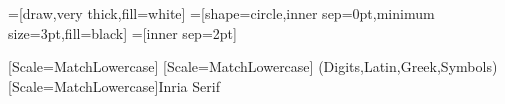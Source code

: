 


\usepackage{etex} %



\usepackage[english]{babel}

\usepackage{cmap}
\usepackage{graphicx}
\usepackage{color,colortbl,spot}
\usepackage{pgfplots}




\usepackage{hyperref}
\usepackage{appendixnumberbeamer}

\usepackage{booktabs} %
\usepackage{subcaption}
\usepackage{comment}


\usepackage{amsmath}
\usepackage{amssymb}


\usepackage{multicol}
\usepackage{multirow}
\usepackage{array} %



\usepackage[absolute,overlay]{textpos}
\usepackage{overpic}
\usepackage{tikz}
\usetikzlibrary{decorations.pathreplacing}
\usetikzlibrary{arrows}
\usetikzlibrary{arrows.meta}
\usetikzlibrary{patterns}
\usetikzlibrary{shapes}
\usetikzlibrary{shadows}
\usetikzlibrary{calc}
\usetikzlibrary{math}
=[draw,very thick,fill=white]
=[shape=circle,inner sep=0pt,minimum size=3pt,fill=black]
=[inner sep=2pt]





\usepackage{mathspec}
\setmainfont{Inria Serif}[Scale=MatchLowercase]
\setsansfont{Inria Sans}[Scale=MatchLowercase]
\setmathfont(Digits,Latin,Greek,Symbols)[Scale=MatchLowercase]{Inria Serif}





